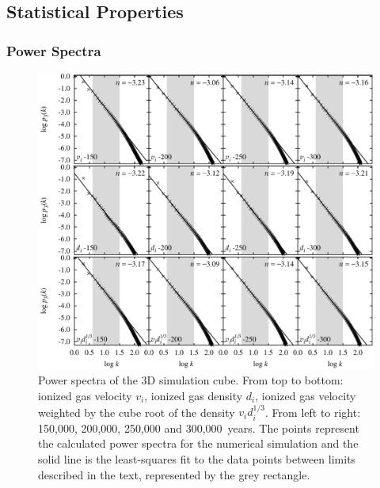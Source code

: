 \documentclass[useAMS,usenatbib]{mn2e}
\providecommand{\DIFaddbeginFL}{} %
\providecommand{\DIFaddendFL}{} %
\providecommand{\DIFdelbeginFL}{} %
\providecommand{\DIFdelendFL}{} %
\begin{document}
\subsection{Statistical Properties}
\label{subsec:statprop}
\subsubsection{Power Spectra}
\label{sssec:pspec}
\begin{figure}
\centering
\DIFdelbeginFL %
\DIFdelendFL %
\DIFaddbeginFL \includegraphics[width=\textwidth]{ps-all-3k-ref}
\DIFaddendFL \caption{Power spectra of the 3D simulation cube. From top to bottom: ionized gas velocity
  $v_i$, ionized gas density $d_i$, ionized gas velocity weighted by the cube root
  of the density $v_i d_i^{1/3}$.  From left to right: 150,000, 200,000, 250,000 and
  300,000~years. The points represent the calculated power spectra for
  the numerical simulation  and the solid line is the least-squares fit to
the data points between limits described in the
text, represented by the grey rectangle.}
\label{fig:ps}
\end{figure}
\end{document}
